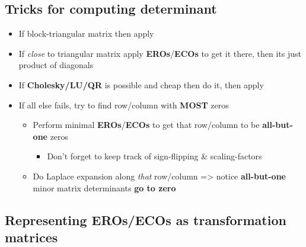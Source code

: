 \subsection*{Tricks for computing
      determinant}

\begin{itemize}

      \item
            If block-triangular matrix then apply
      \item
            If \emph{close} to triangular matrix apply \textbf{EROs}/\textbf{ECOs}
            to get it there, then its just product of diagonals
      \item
            If \textbf{Cholesky/LU/QR} is possible and cheap then do it, then
            apply 
            \tcbbreak
      \item
            If all else fails, try to find row/column with \textbf{MOST} zeros

            \begin{itemize}

                  \item
                        Perform minimal \textbf{EROs}/\textbf{ECOs} to get that row/column
                        to be \textbf{all-but-one} zeros

                        \begin{itemize}

                              \item
                                    Don't forget to keep track of sign-flipping \& scaling-factors
                        \end{itemize}
                  \item
                        Do Laplace expansion along \emph{that} row/column =>
                        notice \textbf{all-but-one} minor matrix determinants \textbf{go to
                              zero}
            \end{itemize}
\end{itemize}

\subsection*{Representing EROs/ECOs as transformation matrices}



